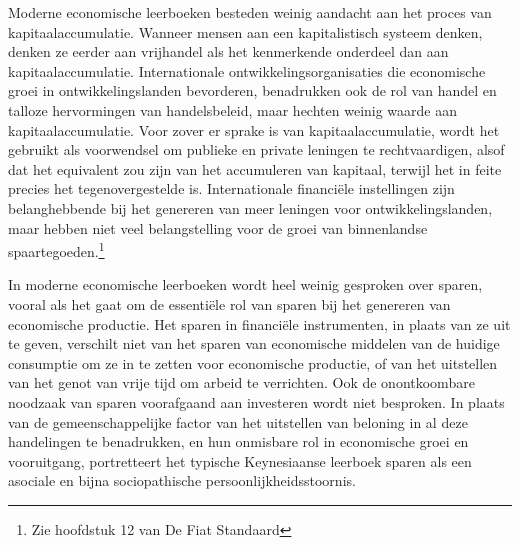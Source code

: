 Moderne economische leerboeken besteden weinig aandacht aan het proces van kapitaalaccumulatie. Wanneer mensen aan een kapitalistisch systeem denken, denken ze eerder aan vrijhandel als het kenmerkende onderdeel dan aan kapitaalaccumulatie. Internationale ontwikkelingsorganisaties die economische groei in ontwikkelingslanden bevorderen, benadrukken ook de rol van handel en talloze hervormingen van handelsbeleid, maar hechten weinig waarde aan kapitaalaccumulatie. Voor zover er sprake is van kapitaalaccumulatie, wordt het gebruikt als voorwendsel om publieke en private leningen te rechtvaardigen, alsof dat het equivalent zou zijn van het accumuleren van kapitaal, terwijl het in feite precies het tegenovergestelde is. Internationale financiële instellingen zijn belanghebbende bij het genereren van meer leningen voor ontwikkelingslanden, maar hebben niet veel belangstelling voor de groei van binnenlandse spaartegoeden.\footnote{Zie hoofdstuk 12 van De Fiat Standaard}

In moderne economische leerboeken wordt heel weinig gesproken over sparen, vooral als het gaat om de essentiële rol van sparen bij het genereren van economische productie. Het sparen in financiële instrumenten, in plaats van ze uit te geven, verschilt niet van het sparen van economische middelen van de huidige consumptie om ze in te zetten voor economische productie, of van het uitstellen van het genot van vrije tijd om arbeid te verrichten. Ook de onontkoombare noodzaak van sparen voorafgaand aan investeren wordt niet besproken. In plaats van de gemeenschappelijke factor van het uitstellen van beloning in al deze handelingen te benadrukken, en hun onmisbare rol in economische groei en vooruitgang, portretteert het typische Keynesiaanse leerboek sparen als een asociale en bijna sociopathische persoonlijkheidsstoornis.

